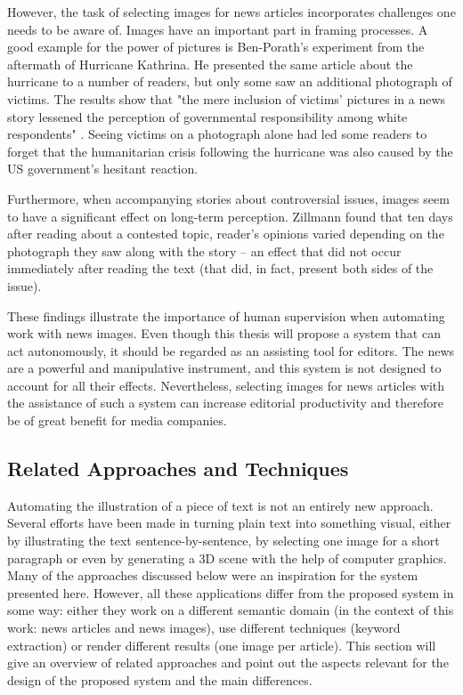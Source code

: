 \documentclass[11pt,a4paper,twoside]{article}
\begin{document}
However, the task of selecting images for news articles incorporates challenges one needs to be aware of. Images have an important part in framing processes. A good example for the power of pictures is Ben-Porath's experiment from the aftermath of Hurricane Kathrina. \cite{Ben-Porath2010NewsKatrina} He presented the same article about the hurricane to a number of readers, but only some saw an additional photograph of victims. The results show that "the mere inclusion of victims’ pictures in a news story lessened the perception of governmental responsibility among white respondents" \cite[p. 482]{Ben-Porath2010NewsKatrina}. Seeing victims on a photograph alone had led some readers to forget that the humanitarian crisis following the hurricane was also caused by the US government's hesitant reaction.

Furthermore, when accompanying stories about controversial issues, images seem to have a significant effect on long-term perception. Zillmann found that ten days after reading about a contested topic, reader's opinions varied depending on the photograph they saw along with the story -- an effect that did not occur immediately after reading the text (that did, in fact, present both sides of the issue). \cite{Zillmann1999EffectsPerception}

These findings illustrate the importance of human supervision when automating work with news images. Even though this thesis will propose a system that can act autonomously, it should be regarded as an assisting tool for editors. The news are a powerful and manipulative instrument, and this system is not designed to account for all their effects. Nevertheless, selecting images for news articles with the assistance of such a system can increase editorial productivity and therefore be of great benefit for media companies.

\subsection{Related Approaches and Techniques} \label{TheoryTech}

Automating the illustration of a piece of text is not an entirely new approach. Several efforts have been made in turning plain text into something visual, either by illustrating the text sentence-by-sentence, by selecting one image for a short paragraph or even by generating a 3D scene with the help of computer graphics. Many of the approaches discussed below were an inspiration for the system presented here. However, all these applications differ from the proposed system in some way: either they work on a different semantic domain (in the context of this work: news articles and news images), use different techniques (keyword extraction) or render different results (one image per article). This section will give an overview of related approaches and point out the aspects relevant for the design of the proposed system and the main differences.
\end{document}
